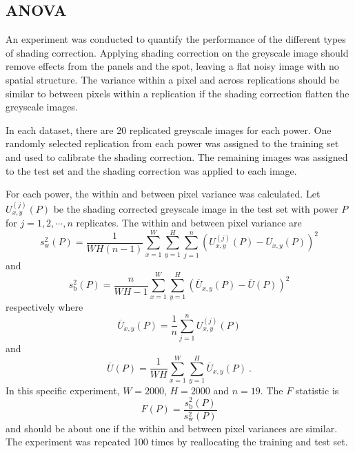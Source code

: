 \subsection{ANOVA}

An experiment was conducted to quantify the performance of the different types of shading correction. Applying shading correction on the greyscale image should remove effects from the panels and the spot, leaving a flat noisy image with no spatial structure. The variance within a pixel and across replications should be similar to between pixels within a replication if the shading correction flatten the greyscale images.

In each dataset, there are 20 replicated greyscale images for each power. One randomly selected replication from each power was assigned to the training set and used to calibrate the shading correction. The remaining images was assigned to the test set and the shading correction was applied to each image.

For each power, the within and between pixel variance was calculated. Let $U_{x,y}^{(j)}(P)$ be the shading corrected greyscale image in the test set with power $P$ for $j=1,2,\cdots,n$ replicates. The within and between pixel variance are
\begin{equation}
s_\mathrm{w}^2(P)=\dfrac{1}{WH(n-1)}
  \sum_{x=1}^{W}\sum_{y=1}^{H}\sum_{j=1}^{n}
  \left(
    U_{x,y}^{(j)}(P) - \overline{U}_{x,y}(P)
  \right)^2
\end{equation}
and
\begin{equation}
s_\mathrm{b}^2(P)=\dfrac{n}{WH-1}
  \sum_{x=1}^{W}\sum_{y=1}^{H}
  \left(
    \overline{U}_{x,y}(P) - \overline{U}(P)
  \right)^2
\end{equation}
respectively where
\begin{equation}
  \overline{U}_{x,y}(P) = \dfrac{1}{n}\sum_{j=1}^{n}U_{x,y}^{(j)}(P)
\end{equation}
and
\begin{equation}
  \overline{U}(P) = \dfrac{1}{WH}\sum_{x=1}^{W}\sum_{y=1}^{H}\overline{U}_{x,y}(P)
  \ .
\end{equation}
In this specific experiment, $W=2000$, $H=2000$ and $n=19$. The $F$ statistic is
\begin{equation}
F(P)=\dfrac{s_\mathrm{b}^2(P)}{s_\mathrm{w}^2(P)}
\end{equation}
and should be about one if the within and between pixel variances are similar. The experiment was repeated 100 times by reallocating the training and test set.

